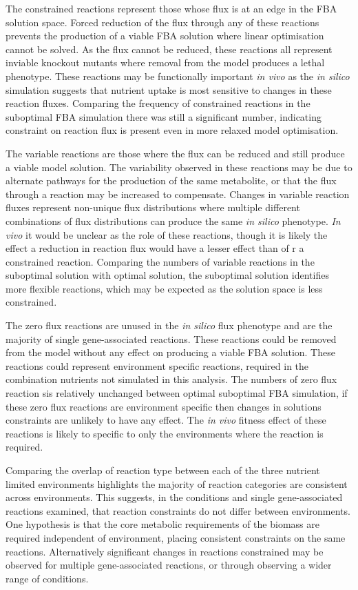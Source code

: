 The constrained reactions represent those whose flux is at an edge in the FBA solution space. Forced reduction of the flux through any of these reactions prevents the production of a viable FBA solution where linear optimisation cannot be solved. As the flux cannot be reduced, these reactions all represent inviable knockout mutants where removal from the model produces a lethal phenotype. These reactions may be functionally important \emph{in vivo} as the \emph{in silico} simulation suggests that nutrient uptake is most sensitive to changes in these reaction fluxes. Comparing the frequency of constrained reactions in the suboptimal FBA simulation there was still a significant number, indicating constraint on reaction flux is present even in more relaxed model optimisation.

The variable reactions are those where the flux can be reduced and still produce a viable model solution. The variability observed in these reactions may be due to alternate pathways for the production of the same metabolite, or that the flux through a reaction may be increased to compensate. Changes in variable reaction fluxes represent non-unique flux distributions where multiple different combinations of flux distributions can produce the same \emph{in silico} phenotype. \emph{In vivo} it would be unclear as the role of these reactions, though it is likely the effect a reduction in reaction flux would have a lesser effect than of r a constrained reaction. Comparing the numbers of variable reactions in the suboptimal solution with optimal solution, the suboptimal solution identifies more flexible reactions, which may be expected as the solution space is less constrained.

The zero flux reactions are unused in the \emph{in silico} flux phenotype and are the majority of single gene-associated reactions. These reactions could be removed from the model without any effect on producing a viable FBA solution. These reactions could represent environment specific reactions, required in the combination nutrients not simulated in this analysis. The numbers of zero flux reaction sis relatively unchanged between optimal suboptimal FBA simulation, if these zero flux reactions are environment specific then changes in solutions constraints are unlikely to have any effect. The \emph{in vivo} fitness effect of these reactions is likely to specific to only the environments where the reaction is required.

Comparing the overlap of reaction type between each of the three nutrient limited environments highlights the majority of reaction categories are consistent across environments. This suggests, in the conditions and single gene-associated reactions examined, that reaction constraints do not differ between environments. One hypothesis is that the core metabolic requirements of the biomass are required independent of environment, placing consistent constraints on the same reactions. Alternatively significant changes in reactions constrained may be observed for multiple gene-associated reactions, or through observing a wider range of conditions.

